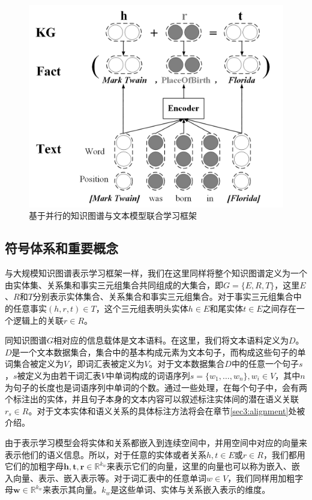 \begin{figure}[h]
\centering
\includegraphics[width=0.9\columnwidth]{figures/ch3/joint.jpg}
\caption{基于并行的知识图谱与文本模型联合学习框架}
\label{fig3:joinglearning}
\end{figure}

\subsection{符号体系和重要概念}

与大规模知识图谱表示学习框架一样，我们在这里同样将整个知识图谱定义为一个由实体集、关系集和事实三元组集合共同组成的大集合，即$G = \{E, R, T\}$，这里$E$、$R$和$T$分别表示实体集合、关系集合和事实三元组集合。对于事实三元组集合中的任意事实$(h, r, t) \in T$，这个三元组表明头实体$h \in E$和尾实体$t \in E$之间存在一个逻辑上的关联$r \in R$。

同知识图谱$G$相对应的信息载体是文本语料。在这里，我们将文本语料定义为$D$。$D$是一个文本数据集合，集合中的基本构成元素为文本句子，而构成这些句子的单词集合被定义为$V$，即词汇表被定义为$V$。对于文本数据集合$D$中的任意一个句子$s$，$s$被定义为由若干词汇表$V$中单词构成的词语序列$s = \{w_1, \ldots, w_n\}, w_i \in V$，其中$n$为句子的长度也是词语序列中单词的个数。通过一些处理，在每个句子中，会有两个标注出的实体，并且句子本身的文本内容可以叙述标注实体间的潜在语义关联$r_s \in R$。对于文本实体和语义关系的具体标注方法将会在章节\ref{sec3:alignment}处被介绍。

由于表示学习模型会将实体和关系都嵌入到连续空间中，并用空间中对应的向量来表示他们的语义信息。所以，对于任意的实体或者关系$h, t \in E$或$r \in R$，我们都用它们的加粗字母$\mathbf{h}, \mathbf{t}, \mathbf{r} \in \mathbb{R}^{k_w}$来表示它们的向量，这里的向量也可以称为嵌入、嵌入向量、表示、嵌入表示等。对于词汇表中的任意单词$w \in V$，我们同样用加粗字母$\mathbf{w}\in \mathbb{R}^{k_w}$来表示其向量。$k_w$是这些单词、实体与关系嵌入表示的维度。

